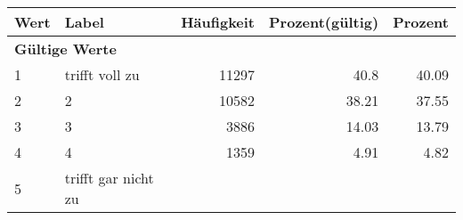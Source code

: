      \begin{longtable}{lXrrr}
     \toprule
     \textbf{Wert} & \textbf{Label} & \textbf{Häufigkeit} & \textbf{Prozent(gültig)} & \textbf{Prozent} \\
     \endhead
     \midrule
     \multicolumn{5}{l}{\textbf{Gültige Werte}}\\

     1 &
     \multicolumn{1}{X}{ trifft voll zu   } &


       \num{11297} &
       \num[round-mode=places,round-precision=2]{40.8} &
         \num[round-mode=places,round-precision=2]{40.09} \\

     2 &
     \multicolumn{1}{X}{ 2   } &


       \num{10582} &
       \num[round-mode=places,round-precision=2]{38.21} &
         \num[round-mode=places,round-precision=2]{37.55} \\

     3 &
     \multicolumn{1}{X}{ 3   } &


       \num{3886} &
       \num[round-mode=places,round-precision=2]{14.03} &
         \num[round-mode=places,round-precision=2]{13.79} \\

     4 &
     \multicolumn{1}{X}{ 4   } &


       \num{1359} &
       \num[round-mode=places,round-precision=2]{4.91} &
         \num[round-mode=places,round-precision=2]{4.82} \\

     5 &
     \multicolumn{1}{X}{ trifft gar nicht zu   } &



\end{longtable}
